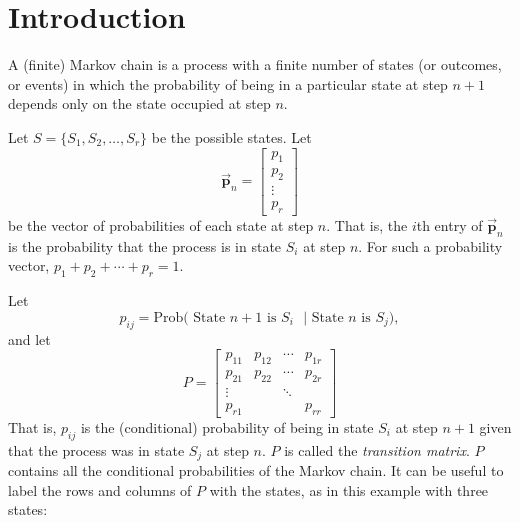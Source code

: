 \documentclass[reqno]{immbook}
\newcommand{\BP}{\vec{\textbf{p}}}
\numberwithin{equation}{chapter}
\numberwithin{question}{section}
\numberwithin{theorem}{chapter}
\numberwithin{figure}{chapter}
\theoremstyle{definition}
\begin{document}
\section{Introduction}
A (finite) Markov chain is a process with a finite
number of states (or outcomes, or events) in which
the probability of being in a particular state
at step $n+1$ depends only on the state occupied
at step $n$.

Let $S = \{S_1,S_2,\ldots,S_r\}$ be the possible states.
Let
\begin{equation}
   \BP_n = \begin{bmatrix}
               p_1 \\ p_2 \\ \vdots \\ p_r
           \end{bmatrix}
\end{equation}
be the vector  of probabilities of each state
at step $n$. That is, the $i$th entry of $\BP_n$
is the probability that the process is in
state $S_i$ at step $n$.
For such a probability vector, $p_1+p_2+\cdots+p_r = 1$.

Let
\begin{equation}
  p_{ij} = \textrm{Prob( State $n+1$ is $S_i$ $|$ State $n$ is $S_j$)},
\end{equation}
and let
\begin{equation}
   P = \begin{bmatrix}
           p_{11} & p_{12} & \cdots & p_{1r} \\
	   p_{21} & p_{22} & \cdots & p_{2r} \\
	   \vdots  &  & \ddots \\
	   p_{r1} &  & & p_{rr}
       \end{bmatrix}
\end{equation}
That is, $p_{ij}$ is the (conditional) probability
of being in state $S_i$ at step $n+1$ given that the
process was in state $S_j$ at step $n$.
$P$ is called the \emph{transition matrix}.
$P$ contains all the conditional probabilities
of the Markov chain.
It can be useful to label the rows and columns
of $P$ with the states, as in this example
with three states:
\end{document}
